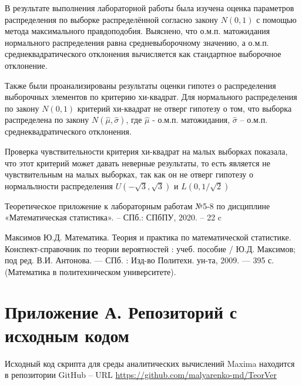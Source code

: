 \documentclass[12pt]{article}
\begin{document}
\begin{flushleft}
В результате выполнения лабораторной работы была изучена оценка параметров распределения по выборке распределённой согласно закону $N(0, 1)$ с помощью метода максимального правдоподобия. Выяснено, что о.м.п. матожидания нормального распределения равна средневыборочному значению, а о.м.п. среднеквадратического отклонения вычисляется как стандартное выборочное отклонение.

Также были проанализированы результаты оценки гипотез о распределения выборочных элементов по критерию хи-квадрат. Для нормального распределения по закону $N(0, 1)$ критерий хи-квадрат не отверг гипотезу о том, что выборка распределена по закону $N(\hat{\mu}, \hat{\sigma})$, где $\hat{\mu}$ - о.м.п. матожидания, $\hat{\sigma}$ -- о.м.п. среднеквадратического отклонения.

Проверка чувствительности критерия хи-квадрат на малых выборках показала, что этот критерий может давать неверные результаты, то есть является не чувствительным на малых выборках, так как он не отверг гипотезу о нормальлности распределения $U(-\sqrt{3}, \sqrt{3})$ и $L(0, 1/\sqrt{2})$
\newpage

	\begin{thebibliography}{9}

		Теоретическое приложение к лабораторным работам №5-8 по дисциплине «Математическая статистика». -- СПб.: СПбПУ, 2020. -- 22 c 
		
		Максимов Ю.Д. Математика. Теория и практика по математической статистике. Конспект-справочник по теории вероятностей : учеб. пособие / Ю.Д. Максимов; под ред. В.И. Антонова. — СПб. : Изд-во Политехн. ун-та, 2009. — 395 с. (Математика в политехническом университете).

	\end{thebibliography}

\newpage

\section*{Приложение А. Репозиторий с исходным кодом}

Исходный код скрипта для среды аналитических вычислений Maxima находится в репозитории GitHub -- URL \url{https://github.com/malyarenko-md/TeorVer}

\end{flushleft}
\end{document}
